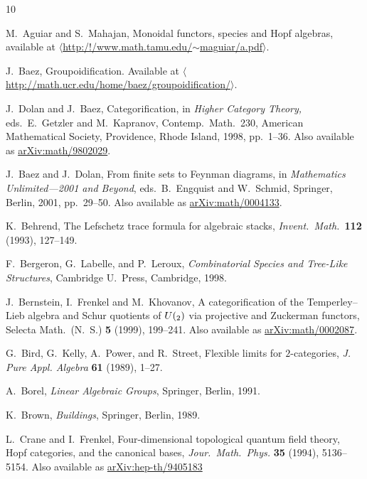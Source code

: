 \documentclass{article}
\begin{document}
\begin{thebibliography}{10}

 M.\ Aguiar and S.\ Mahajan, Monoidal functors,
species and Hopf algebras, available at
\href{http://www.math.tamu.edu/~maguiar/a.pdf}
{$\langle$http:/!/www.math.tamu.edu/$\sim$maguiar/a.pdf$\rangle$}.

J.\ Baez, Groupoidification.  Available at\hfill\break
\href{http://math.ucr.edu/home/baez/groupoidification/}
{$\langle$http:/\!/math.ucr.edu/home/baez/groupoidification/$\rangle$}.

J.\ Dolan and J.\ Baez, Categorification, in
{\sl Higher Category Theory,} eds.\ E.\ Getzler and M.\ Kapranov,
Contemp.\ Math.\ 230, American Mathematical Society, Providence, Rhode
Island, 1998, pp.\ 1--36.  Also available as
\href{http://arxiv.org/abs/math/9802029}
{arXiv:math/9802029}.

J.\ Baez and J.\ Dolan, From finite sets to Feynman diagrams, in {\em
Mathematics Unlimited---2001 and Beyond}, eds.\ B.\ Engquist
and W.\ Schmid, Springer, Berlin, 2001, pp.\ 29--50.  
Also available as \href{http://arxiv.org/abs/math/0004133}
{arXiv:math/0004133}.

K.\ Behrend, The Lefschetz trace formula for algebraic stacks, {\em
Invent.\ Math.\ }{\bf 112} (1993), 127--149.

F.\ Bergeron, G.\ Labelle, and P.\ Leroux, {\sl Combinatorial Species
and Tree-Like Structures}, Cambridge U.\ Press, Cambridge, 1998.

J.\ Bernstein, I.\ Frenkel and M.\ Khovanov, A categorification
of the Temperley--Lieb algebra and Schur quotients of $U(\sl_2)$
via projective and Zuckerman functors, \textrm{Selecta Math.\ (N.\ S.)}
{\bf 5} (1999), 199--241.
Also available as \href{http://arxiv.org/abs/math/0002087}
{arXiv:math/0002087}.

G.\ Bird, G.\ Kelly, A.\ Power, and R.\ Street, Flexible limits for
$2$-categories, {\sl J. Pure Appl. Algebra }{\bf 61} (1989),
1--27.

 A.\ Borel, {\sl Linear Algebraic Groups}, Springer, 
Berlin, 1991.

 K.\ Brown, {\sl Buildings}, Springer, Berlin,
1989.

L.\ Crane and I.\ Frenkel, Four-dimensional topological
quantum field theory, Hopf categories, and the canonical bases,
\textsl{Jour.\ Math.\ Phys.} \textbf{35} (1994), 5136--5154.
Also available as \href{http://arxiv.org/abs/hep-th/9405183}
{arXiv:hep-th/9405183}


\end{thebibliography}
\end{document}
